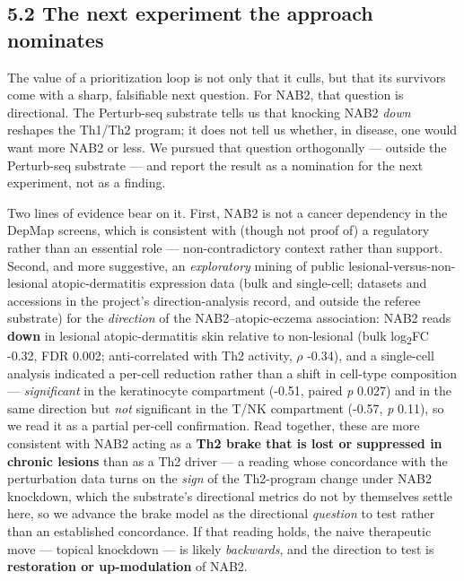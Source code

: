 \subsection*{5.2 The next experiment the approach nominates}\label{the-next-experiment-the-approach-nominates}

The value of a prioritization loop is not only that it culls, but that its survivors come with a sharp,
falsifiable next question. For NAB2, that question is directional. The Perturb-seq substrate tells us that
knocking NAB2 \emph{down} reshapes the Th1/Th2 program; it does not tell us whether, in disease, one would want
more NAB2 or less. We pursued that question orthogonally --- outside the Perturb-seq substrate --- and report the
result as a nomination for the next experiment, not as a finding.

Two lines of evidence bear on it. First, NAB2 is not a cancer dependency in the DepMap screens, which is
consistent with (though not proof of) a regulatory rather than an essential role --- non-contradictory context
rather than support. Second, and more suggestive, an \emph{exploratory} mining of public lesional-versus-non-lesional
atopic-dermatitis expression data (bulk and single-cell; datasets and accessions in the project's
direction-analysis record, and outside the referee substrate) for the \emph{direction} of the
NAB2--atopic-eczema association: NAB2 reads \textbf{down} in lesional atopic-dermatitis skin relative to non-lesional
(bulk log\textsubscript{2}FC -0.32, FDR 0.002; anti-correlated with Th2 activity, $\rho$ -0.34), and a single-cell analysis
indicated a per-cell reduction rather than a shift in cell-type composition --- \emph{significant} in the
keratinocyte compartment (-0.51, paired \emph{p} 0.027) and in the same direction but \emph{not} significant in
the T/NK compartment (-0.57, \emph{p} 0.11), so we read it as a partial per-cell confirmation. Read together, these are more
consistent with NAB2 acting as a \textbf{Th2 brake that is lost or suppressed in chronic lesions} than as a Th2
driver --- a reading whose concordance with the perturbation data turns on the \emph{sign} of the Th2-program
change under NAB2 knockdown, which the substrate's directional metrics do not by themselves settle here, so
we advance the brake model as the directional \emph{question} to test rather than an established concordance. If that reading holds, the naive
therapeutic move --- topical knockdown --- is likely \emph{backwards}, and the direction to test is
\textbf{restoration or up-modulation} of NAB2.


